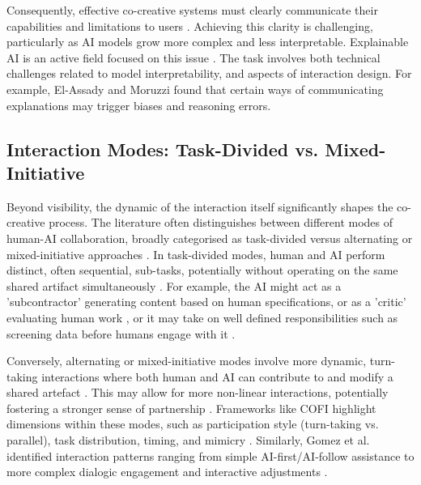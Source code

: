 Consequently, effective co-creative systems must clearly communicate their capabilities and limitations to users \cite{Buschek2021-ks}. Achieving this clarity is challenging, particularly as AI models grow more complex and less interpretable. Explainable AI is an active field focused on this issue \cite{Zhu2018-zd, Llano2022-ti, Newn2020-mv, Shneiderman2020-je, Linardatos2020-uq, El-Assady2022-qc, Gomez2023-bp}. The task involves both technical challenges related to model interpretability, and aspects of interaction design. For example, El-Assady and Moruzzi \cite{El-Assady2022-qc} found that certain ways of communicating explanations may trigger biases and reasoning errors.

\subsection{Interaction Modes: Task-Divided vs. Mixed-Initiative}

Beyond visibility, the dynamic of the interaction itself significantly shapes the co-creative process. The literature often distinguishes between different modes of human-AI collaboration, broadly categorised as task-divided versus alternating or mixed-initiative approaches \cite{Kantosalo2020-nh, Kantosalo2016-nm}. In task-divided modes, human and AI perform distinct, often sequential, sub-tasks, potentially without operating on the same shared artifact simultaneously \cite{Kantosalo2016-nm}. For example, the AI might act as a 'subcontractor' generating content based on human specifications, or as a 'critic' evaluating human work \cite{Lin2023-zq}, or it may take on well defined responsibilities such as screening data before humans engage with it \cite{Jia2024-vp}. 

Conversely, alternating or mixed-initiative modes involve more dynamic, turn-taking interactions where both human and AI can contribute to and modify a shared artefact \cite{Kantosalo2020-nh, Kantosalo2016-nm, Lin2023-zq}. This may allow for more non-linear interactions, potentially fostering a stronger sense of partnership \cite{Davis2016-te, Zhou2024-vp}. Frameworks like COFI highlight dimensions within these modes, such as participation style (turn-taking vs. parallel), task distribution, timing, and mimicry \cite{Rezwana2022-gg}. Similarly, Gomez et al. identified interaction patterns ranging from simple AI-first/AI-follow assistance to more complex dialogic engagement and interactive adjustments \cite{Gomez2023-bp}.

